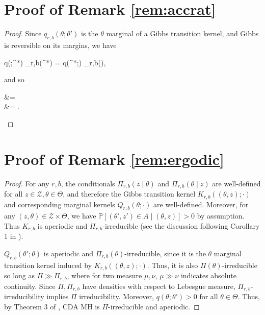 \documentclass[twoside,11pt]{article}
\newcommand{\be}{\begin{equs}}
\newcommand{\ee}{\end{equs}}
\newcommand{\bb}[1]{\mathbb{#1}}
\newcommand{\mc}[1]{\mathcal{#1}}
\newcommand{\1}{\mathbf 1}
\begin{document}
{%

\appendix

\section{Proof of Remark \ref{rem:accrat}}
\begin{proof}
Since $q_{r,b}(\theta;\theta')$ is the $\theta$ marginal of a Gibbs transition kernel, and Gibbs is reversible on its margins, we have
\be
q(\theta;\theta^*) \Pi_{r,b}(\theta^*) = q(\theta^*;\theta) \Pi_{r,b}(\theta),
\ee 
and so
\be
{} &=  \\
&= .
\ee
\end{proof}

\section{Proof of Remark \ref{rem:ergodic}}
\begin{proof}
For any $r,b$, the conditionals $\Pi_{r,b}(z \mid \theta)$ and $\Pi_{r,b}(\theta \mid z)$ are well-defined for all $z \in \mc Z, \theta \in \Theta$, and therefore the Gibbs transition kernel $K_{r,b}((\theta,z);\cdot)$ and corresponding marginal kernels $Q_{r,b}(\theta;\cdot)$ are well-defined. Moreover, for any $(z,\theta) \in \mc Z \times \Theta$, we have $\bb P[(\theta',z') \in A \mid (\theta,z)] > 0$ by assumption. Thus $K_{r,b}$ is aperiodic and $\Pi_{r,b}$-irreducible (see the discussion following Corollary 1 in \cite{roberts1994simple}).

$Q_{r,b}(\theta';\theta)$ is aperiodic and $\Pi_{r,b}(\theta)$-irreducible, since it is the $\theta$ marginal transition kernel induced by $K_{r,b}((\theta,z);\cdot)$. Thus, it is also $\Pi(\theta)$-irreducible so long as $\Pi \gg \Pi_{r,b}$, where for two measure $\mu,\nu$, $\mu \gg \nu$ indicates absolute continuity. Since $\Pi, \Pi_{r,b}$ have densities with respect to Lebesgue measure, $\Pi_{r,b}$-irreducibility implies $\Pi$ irreducibility. Moreover, $q(\theta;\theta') > 0$ for all $\theta \in \Theta$. Thus, by Theorem 3 of \cite{roberts1994simple}, CDA MH is $\Pi$-irreducible and aperiodic. 
\end{proof}




}
\end{document}
